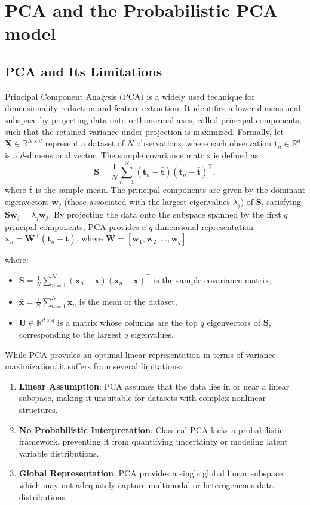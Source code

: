 \documentclass{article}
\begin{document}
  
\section{PCA and the Probabilistic PCA model}
\subsection{PCA and Its Limitations}

Principal Component Analysis (PCA) is a widely used technique for dimensionality reduction and feature extraction. 
It identifies a lower-dimensional subspace by projecting data onto orthonormal axes, called principal components, such that the retained variance under projection is maximized.
 Formally, let $\mathbf{X} \in \mathbb{R}^{N \times d}$ represent a dataset of $N$ observations, where each observation $\mathbf{t}_n \in \mathbb{R}^d$ is a $d$-dimensional vector. 
 The sample covariance matrix is defined as 
\[
\mathbf{S} = \frac{1}{N} \sum_{n=1}^N (\mathbf{t}_n - \bar{\mathbf{t}})(\mathbf{t}_n - \bar{\mathbf{t}})^\top,
\]
where $\bar{\mathbf{t}}$ is the sample mean. The principal components are given by the dominant eigenvectors $\mathbf{w}_j$ (those associated with the largest eigenvalues $\lambda_j$) of $\mathbf{S}$,
 satisfying $\mathbf{S}\mathbf{w}_j = \lambda_j \mathbf{w}_j$. By projecting the data onto the subspace spanned by the first $q$ principal components, PCA provides a $q$-dimensional
  representation $\mathbf{x}_n = \mathbf{W}^\top (\mathbf{t}_n - \bar{\mathbf{t}})$, where $\mathbf{W} = [\mathbf{w}_1, \mathbf{w}_2, \dots, \mathbf{w}_q]$.

where:
\begin{itemize}
    \item $\mathbf{S} = \frac{1}{N} \sum_{n=1}^N (\mathbf{x}_n - \bar{\mathbf{x}})(\mathbf{x}_n - \bar{\mathbf{x}})^\top$ is the sample covariance matrix,
    \item $\bar{\mathbf{x}} = \frac{1}{N} \sum_{n=1}^N \mathbf{x}_n$ is the mean of the dataset,
    \item $\mathbf{U} \in \mathbb{R}^{d \times q}$ is a matrix whose columns are the top $q$ eigenvectors of $\mathbf{S}$, corresponding to the largest $q$ eigenvalues.
\end{itemize}


While PCA provides an optimal linear representation in terms of variance maximization, it suffers from several limitations:
\begin{enumerate}
    \item \textbf{Linear Assumption}: PCA assumes that the data lies in or near a linear subspace, making it unsuitable for datasets with complex nonlinear structures.
    \item \textbf{No Probabilistic Interpretation}: Classical PCA lacks a probabilistic framework, preventing it from quantifying uncertainty or modeling latent variable distributions.
    \item \textbf{Global Representation}: PCA provides a single global linear subspace, which may not adequately capture multimodal or heterogeneous data distributions.
\end{enumerate}
\end{document}
